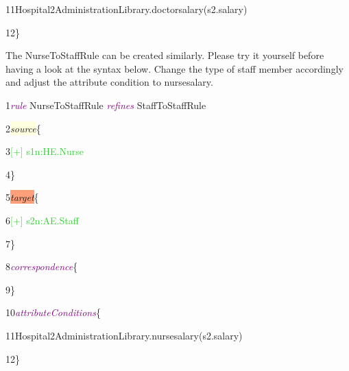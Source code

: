 {{11\hspace{1cm}Hospital2AdministrationLibrary.doctorsalary(s2.salary)

12\hspace{0.5cm}\}\newline

}

\clearpage

The \textsf{NurseToStaffRule} can be created similarly. Please try it yourself before having a look at the syntax below. Change the type of staff member accordingly and adjust the attribute condition to \textsf{nursesalary}.\newline

{
	
	1\hspace{0.5cm}\textcolor{Purple}{\textit{rule}} NurseToStaffRule \textcolor{Purple}{\textit{refines}} StaffToStaffRule
	
	2\hspace{0.5cm}\colorbox{LightYellow}{\textit{source}}\{
	
	3\hspace{1cm}\textcolor{LimeGreen}{[+] s1n:HE.Nurse}
	
	4\hspace{0.5cm}\}
	
	5\hspace{0.5cm}\colorbox{LightSalmon}{\textit{target}}\{
	
	6\hspace{1cm}\textcolor{LimeGreen}{[+] s2n:AE.Staff}
	
	7\hspace{0.5cm}\}
	
	8\hspace{0.5cm}\textcolor{Purple}{\textit{correspondence}}\{
	
	9\hspace{0.5cm}\}
	
	10\hspace{0.42cm}\textcolor{Purple}{\textit{attributeConditions}}\{
	
	11\hspace{1cm}Hospital2AdministrationLibrary.nursesalary(s2.salary)
	
	12\hspace{0.5cm}\}\newline
	
}



}
